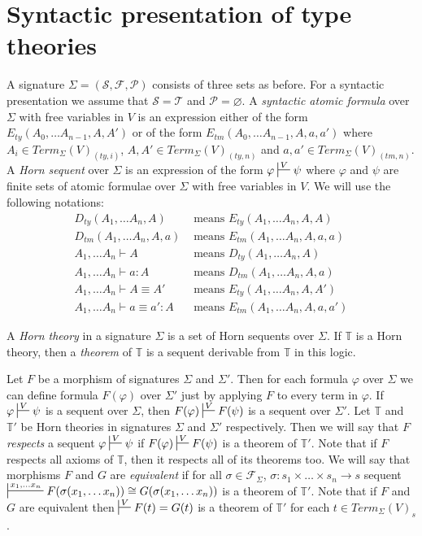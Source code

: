 \documentclass{amsart}
\theoremstyle{definition}
\theoremstyle{remark}
\newcommand{\deq}{\equiv}
\numberwithin{figure}{section}
\begin{document}
\section{Syntactic presentation of type theories}

A signature $\Sigma = (\mathcal{S}, \mathcal{F}, \mathcal{P})$ consists of three sets as before.
For a syntactic presentation we assume that $\mathcal{S} = \mathcal{T}$ and $\mathcal{P} = \varnothing$.
A \emph{syntactic atomic formula} over $\Sigma$ with free variables in $V$ is an expression either of the form $E_{ty}(A_0, \ldots A_{n-1}, A, A')$
or of the form $E_{tm}(A_0, \ldots A_{n-1}, A, a, a')$ where $A_i \in Term_\Sigma(V)_{(ty,i)}$, $A,A' \in Term_\Sigma(V)_{(ty,n)}$ and $a,a' \in Term_\Sigma(V)_{(tm,n)}$.
A \emph{Horn sequent} over $\Sigma$ is an expression of the form $\varphi \sststile{}{V} \psi$ where $\varphi$ and $\psi$ are finite sets of atomic formulae over $\Sigma$ with free variables in $V$.
We will use the following notations:
\begin{align*}
D_{ty}(A_1, \ldots A_n, A) & \text{ means } E_{ty}(A_1, \ldots A_n, A, A) \\
D_{tm}(A_1, \ldots A_n, A, a) & \text{ means } E_{tm}(A_1, \ldots A_n, A, a, a) \\
A_1, \ldots A_n \vdash A & \text{ means } D_{ty}(A_1, \ldots A_n, A) \\
A_1, \ldots A_n \vdash a : A & \text{ means } D_{tm}(A_1, \ldots A_n, A, a) \\
A_1, \ldots A_n \vdash A \deq A' & \text{ means } E_{ty}(A_1, \ldots A_n, A, A') \\
A_1, \ldots A_n \vdash a \deq a' : A & \text{ means } E_{tm}(A_1, \ldots A_n, A, a, a')
\end{align*}

A \emph{Horn theory} in a signature $\Sigma$ is a set of Horn sequents over $\Sigma$.
If $\mathbb{T}$ is a Horn theory, then a \emph{theorem} of $\mathbb{T}$ is a sequent derivable from $\mathbb{T}$ in this logic.

Let $F$ be a morphism of signatures $\Sigma$ and $\Sigma'$.
Then for each formula $\varphi$ over $\Sigma$ we can define formula $F(\varphi)$ over $\Sigma'$ just by applying $F$ to every term in $\varphi$.
If $\varphi \sststile{}{V} \psi$ is a sequent over $\Sigma$, then $F(\varphi) \sststile{}{V} F(\psi)$ is a sequent over $\Sigma'$.
Let $\mathbb{T}$ and $\mathbb{T}'$ be Horn theories in signatures $\Sigma$ and $\Sigma'$ respectively.
Then we will say that $F$ \emph{respects} a sequent $\varphi \sststile{}{V} \psi$ if $F(\varphi) \sststile{}{V} F(\psi)$ is a theorem of $\mathbb{T}'$.
Note that if $F$ respects all axioms of $\mathbb{T}$, then it respects all of its theorems too.
We will say that morphisms $F$ and $G$ are \emph{equivalent} if for all $\sigma \in \mathcal{F}_\Sigma$, $\sigma : s_1 \times \ldots \times s_n \to s$ sequent $\sststile{}{x_1, \ldots x_n} F(\sigma(x_1, \ldots x_n)) \cong G(\sigma(x_1, \ldots x_n))$ is a theorem of $\mathbb{T}'$.
Note that if $F$ and $G$ are equivalent then $\sststile{}{V} F(t) = G(t)$ is a theorem of $\mathbb{T}'$ for each $t \in Term_\Sigma(V)_s$.
\end{document}
